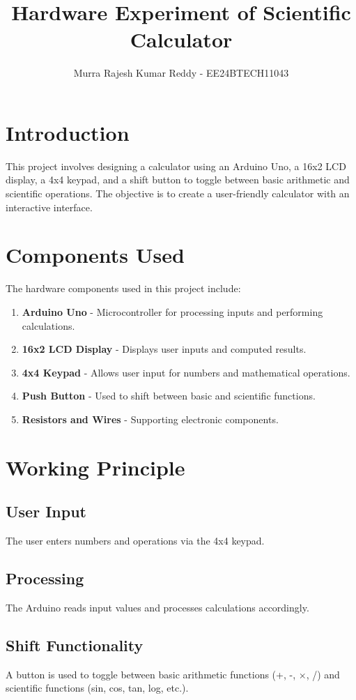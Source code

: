 \documentclass[journal,12pt,onecolumn,article]{IEEEtran}
\theoremstyle{remark}
\begin{document}
\title{Hardware Experiment of Scientific Calculator}
\author{Murra Rajesh Kumar Reddy - EE24BTECH11043}
\maketitle
\section{Introduction}
This project involves designing a calculator using an Arduino Uno, a 16x2 LCD display, a 4x4 keypad, and a shift button to toggle between basic arithmetic and scientific operations. The objective is to create a user-friendly calculator with an interactive interface.

\section{Components Used}
The hardware components used in this project include:
\begin{enumerate}
    \item \textbf{Arduino Uno} - Microcontroller for processing inputs and performing calculations.
    \item \textbf{16x2 LCD Display} - Displays user inputs and computed results.
    \item \textbf{4x4 Keypad} - Allows user input for numbers and mathematical operations.
    \item \textbf{Push Button} - Used to shift between basic and scientific functions.
    \item \textbf{Resistors and Wires} - Supporting electronic components.
\end{enumerate}

\section{Working Principle}
\subsection{User Input}
The user enters numbers and operations via the 4x4 keypad.

\subsection{Processing}
The Arduino reads input values and processes calculations accordingly.

\subsection{Shift Functionality}
A button is used to toggle between basic arithmetic functions (+, -, $\times$, /) and scientific functions (sin, cos, tan, log, etc.).
\end{document}
